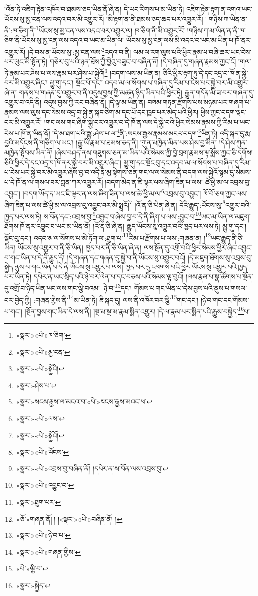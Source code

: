 །འོན་ཏེ་འཇིག་རྟེན་འཁོར་བ་ཐམས་ཅད་ཡིན་ནོ་ཞེ་ན། དེ་ཡང་རིགས་པ་མ་ཡིན་ཏེ། འཇིག་རྟེན་རྟག་ན་འགའ་ཡང་ཡོངས་སུ་མྱ་ངན་ལས་འདའ་བར་མི་འགྱུར་རོ། །མི་རྟག་ན་ནི་ཐམས་ཅད་ཆད་པར་འགྱུར་རོ། །
གཉིས་ཀ་ཡིན་ན་ནི་:ཁ་ཅིག་ནི་\footnote{«སྣར་»«པེ་»ཁ་ཅིག་}ཡོངས་སུ་མྱ་ངན་ལས་འདའ་བར་འགྱུར་ལ། ཁ་ཅིག་ནི་མི་འགྱུར་རོ། །གཉིས་ཀ་མ་ཡིན་ན་ནི་ཁ་ཅིག་ནི་ཡོངས་སུ་མྱ་ངན་ལས་འདའ་བ་ཡང་མ་ཡིན་ལ། ཡོངས་སུ་མྱ་ངན་ལས་མི་འདའ་བ་ཡང་མ་ཡིན་པ་ཁོ་ནར་འགྱུར་རོ། །དེ་བས་ན་ཡོངས་སུ་:མྱ་ངན་ལས་\footnote{«སྣར་»«པེ་»མྱ་ངན་}འདའ་བ་ནི། ལམ་ལ་རག་ལུས་པའི་ཕྱིར་རྣམ་པ་བཞི་ཆར་ཡང་ངེས་པར་ལུང་མི་སྟོན་ཏེ། གཅེར་བུ་པའི་ཉན་ཐོས་ཀྱི་བྱེའུ་བཟུང་བ་བཞིན་ནོ། །དེ་བཞིན་དུ་གཞན་རྣམས་ཀྱང་ངོ། །གལ་ཏེ་རྣམ་པར་ཤེས་པ་ལས་རྣམ་པར་ཤེས་པ་སྐྱེའོ།\footnote{«སྣར་»«པེ་»སྐྱེའི།} །བདག་ལས་མ་ཡིན་ན། ཅིའི་ཕྱིར་རྟག་ཏུ་དེ་དང་འདྲ་བ་ཁོ་ན་སྐྱེ་བར་མི་འགྱུར་ཞིང་། མྱུ་གུ་དང་། སྡོང་པོ་དང་། འདབ་མ་ལ་སོགས་པ་བཞིན་དུ་རིམ་པ་ངེས་པར་སྐྱེ་བར་མི་འགྱུར་ཞེ་ན། གནས་པ་གཞན་དུ་འགྱུར་བ་ནི་འདུས་བྱས་ཀྱི་མཚན་ཉིད་ཡིན་པའི་ཕྱིར་ཏེ། རྒྱུན་གདོན་མི་ཟ་བར་གཞན་དུ་འགྱུར་བ་འདི་ནི། འདུས་བྱས་ཀྱི་རང་བཞིན་ནོ། །དེ་ལྟ་མ་ཡིན་ན། བསམ་གཏན་རྫོགས་པས་མཉམ་པར་གཞག་པ་རྣམས་ལས་ལུས་དང་སེམས་འདྲ་བ་སྐྱེ་ན་སྐད་ཅིག་མ་དང་པོ་དང་ཁྱད་པར་མེད་པའི་ཕྱིར། ཕྱིས་ཀྱང་བདག་ལྡང་བར་མི་འགྱུར་རོ། །གང་ལས་གང་ཞིག་སྐྱེ་བར་འགྱུར་བ་དེ་ཁོ་ན་ལས་དེ་སྐྱེ་བའི་ཕྱིར་སེམས་རྣམས་ཀྱི་རིམ་པ་ཡང་ངེས་པ་ཁོ་ན་ཡིན་ནོ། །དེ་མ་ཐག་པའི་རྒྱུ་:ཤེས་པ་ལ་\footnote{«སྣར་»ཤེས་པ་}ནི་:སངས་རྒྱས་རྣམས་མངའ་བདག་\footnote{«སྣར་»སངས་རྒྱས་ལ་མངའ་བ་«པེ་»སངས་རྒྱས་མའང་ཕ་}ཡིན་ཏེ། འདི་སྐད་དུ་རྨ་བྱའི་མདོངས་ནི་གཅིག་ལ་ཡང་། །རྒྱུ་ཡི་རྣམ་པ་ཐམས་ཅད་ནི། །ཀུན་མཁྱེན་མིན་པས་ཤེས་བྱ་མིན། །དེ་ཤེས་ཀུན་མཁྱེན་སྟོབས་ཡིན་ནོ། །ཞེས་བཤད་ནས་གཟུགས་ཅན་མ་ཡིན་པའི་སེམས་ཀྱི་བྱེ་བྲག་རྣམས་ལྟ་སྨོས་ཀྱང་ཅི་དགོས། ཅིའི་ཕྱིར་དེ་དང་འདྲ་བ་ཁོ་ནར་སྐྱེ་བར་མི་འགྱུར་ཞིང་། མྱུ་གུ་དང་སྡོང་བུ་དང་འདབ་མ་ལ་སོགས་པ་བཞིན་དུ་རིམ་པ་ངེས་པར་སྐྱེ་བར་མི་འགྱུར་ཞེས་བྱ་བ་འདི་ནི་མུ་སྟེགས་ཅན་གང་ལ་ལ་སེམས་ནི་བདག་ལས་སྐྱེའོ་སྙམ་དུ་སེམས་པ་དེ་ཁོ་ན་ལ་གསལ་བར་ཀླན་ཀར་འགྱུར་རོ། །བདག་མེད་ན་ཇི་ལྟར་ལས་ཞིག་ཟིན་པ་ལས། ཚེ་ཕྱི་མ་ལ་འབྲས་བུ་འབྱུང་། །བདག་ཡོད་ན་ཡང་ཇི་ལྟར་ན་ལས་ཞིག་ཟིན་པ་ལས་ཚེ་ཕྱི་མ་ལ་\footnote{«སྣར་»«པེ་»ལས་}འབྲས་བུ་འབྱུང་། ཁོ་བོ་ཅག་ཀྱང་ལས་ཞིག་ཟིན་པ་ལས་ཚེ་ཕྱི་མ་ལ་འབྲས་བུ་འབྱུང་བར་མི་སྨྲའོ།\footnote{«སྣར་»«པེ་»སྐྱེའོ།} །འོ་ན་ཅི་ཡིན་ཞེ་ན། དེའི་རྒྱུད་:ཡོངས་སུ་\footnote{«སྣར་»«པེ་»ཡོངས་}འགྱུར་བའི་ཁྱད་པར་ལས་ཏེ། ས་བོན་དང་:འབྲས་བུ་\footnote{«སྣར་»«པེ་»འབྲས་བུ་བཞིན་ནོ། །དཔེར་ན་ས་བོན་ལས་འབྲས་བུ་}འབྱུང་བ་ཞེས་བྱ་བ་དེ་ནི་ཞིག་པ་ལས་:བྱུང་བ་\footnote{«སྣར་»«པེ་»འབྱུང་བ་}ཡང་མ་ཡིན་ལ་མཇུག་ཐོགས་ཁོ་ནར་འབྱུང་བ་ཡང་མ་ཡིན་ནོ། །འོ་ན་ཅི་ཞེ་ན། རྒྱུད་ཡོངས་སུ་འགྱུར་བའི་ཁྱད་པར་ལས་ཏེ། མྱུ་གུ་དང་། སྡོང་བུ་དང་། འདབ་མ་ལ་སོགས་པ་མེ་ཏོག་ལ་:ཐུག་པ་\footnote{«སྣར་»ཐུག་པར་}རིམ་པ་རྫོགས་པ་ལས་:གཞན་ན། །\footnote{«ཅོ་»གཞན་ནོ། ། །«སྣར་»«པེ་»བཞིན་ནོ། །}ཡང་རྒྱུད་ནི་ཅི་ཡིན། ཡོངས་སུ་འགྱུར་བ་ནི་ཅི་ཡིན། ཁྱད་པར་ནི་ཅི་ཡིན་ཞེ་ན། ལས་སྔོན་དུ་འགྲོ་བའི་ཕྱིར་སེམས་ཕྱིར་ཞིང་འབྱུང་བ་གང་ཡིན་པ་དེ་ནི་རྒྱུད་དོ། །དེ་གཞན་དང་གཞན་དུ་སྐྱེ་བ་ནི་ཡོངས་སུ་འགྱུར་བའོ། །དེ་མཇུག་ཐོགས་སུ་འབྲས་བུ་སྐྱེད་ནུས་པ་གང་ཡིན་པ་དེ་ནི་ཡོངས་སུ་འགྱུར་བ་ལས། ཁྱད་པར་དུ་འཕགས་པའི་ཕྱིར་ཡོངས་སུ་འགྱུར་བའི་ཁྱད་པར་ཡིན་ཏེ། དཔེར་ན་ཡང་སྲིད་པའི་ཉེ་བར་ལེན་པ་དང་བཅས་པའི་སེམས་ལྟ་བུའོ། །ལས་རྣམ་པ་སྣ་ཚོགས་པ་སྔོན་དུ་འགྲོ་བ་ཉིད་ཡིན་ཡང་ལས་གང་ལྕི་བའམ། :ཉེ་བ་\footnote{«སྣར་»«པེ་»ཉེ་བ་པ་}དང་། གོམས་པ་གང་ཡིན་པ་དེས་བྱས་པའི་ནུས་པ་གསལ་བར་བྱེད་ཀྱི། :གཞན་གྱིས་ནི་\footnote{«སྣར་»«པེ་»གཞན་གྱིས་}མ་ཡིན་ཏེ། ཇི་སྐད་དུ། ལས་ནི་འཁོར་བར་ལྕི་\footnote{«པེ་»ལྕི་བ་}གང་དང་། །ཉེ་བ་གང་དང་གོམས་པ་གང་། །སྔོན་བྱས་གང་ཡིན་དེ་ལས་ནི། །སྔ་མ་སྔ་མ་རྣམ་སྨིན་འགྱུར། །དེ་ལ་རྣམ་པར་སྨིན་པའི་རྒྱུས་བསྐྱེད་\footnote{«སྣར་»སྐྱེད་}པ། 